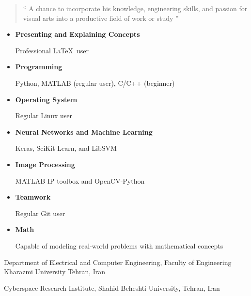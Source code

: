 \begin{quote}
	`` A chance to incorporate his knowledge, engineering skills, and passion for visual arts into a productive field of work or study  ''
\end{quote}

\begin{itemize}
	\item \textbf{Presenting and Explaining Concepts}

		Professional \LaTeX~user
	\item \textbf{Programming}

		Python, MATLAB (regular user), C/C++ (beginner)

	\item{\textbf{Operating System}}

		Regular Linux user


	\item \textbf{Neural Networks and Machine Learning}

		Keras, SciKit-Learn,  and LibSVM

	\item \textbf{Image Processing}

		MATLAB IP toolbox and OpenCV-Python

	\item \textbf{Teamwork}

		Regular Git user

	\item \textbf{Math}

		Capable of modeling real-world problems with mathematical concepts
\end{itemize}



{}



{Department of Electrical and Computer
Engineering,
Faculty of Engineering
Kharazmi University
Tehran, Iran}

\divider

{Cyberspace Research Institute, Shahid Beheshti University, Tehran, Iran}




